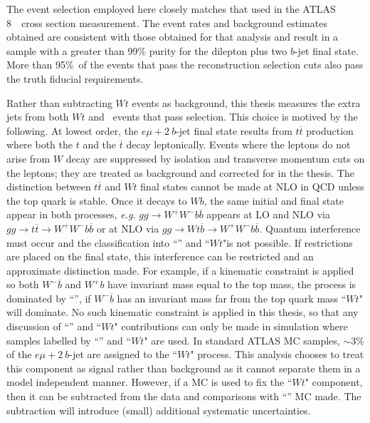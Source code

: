 The event selection employed here closely matches that used in the ATLAS 8~\TeV\ cross
section measurement\cite{xsec}. The event rates and background estimates obtained 
are consistent with those obtained for that analysis and result in a sample with a greater than 99\% purity
for the dilepton plus two $b$-jet final state. More than 95\%\ of
the events that pass the reconstruction selection cuts also pass the truth fiducial requirements.

Rather than subtracting $Wt$ events as background, this thesis measures the extra jets from both $Wt$ and \ttbar\ events that pass selection. This choice is motived by the following. At lowest order, the $e\mu+2\ b$-jet final state results from $t\overline t$ production where both the 
$t$ and the $\overline t$  decay leptonically.  
Events where the leptons do not arise from $W$ decay are suppressed by isolation and
transverse momentum cuts on the leptons; they are treated as background and corrected for in the thesis.
The distinction between $t\overline{t}$ and $Wt$ final states cannot be made at NLO in QCD unless the top quark is stable.
Once it decays to $Wb$, the same initial and final state appear in both processes,
\textit{ e.g.} $gg\to W^+W^- b \overline{b}$ appears at LO and NLO via $gg\to  t\overline{t}\to W^+W^- b \overline{b}$ or
at NLO via  $gg\to  Wt\overline{b} \to W^+W^- b \overline{b}$.
Quantum interference must occur and the classification into
``\ttbar'' and ``$Wt$"is not possible. If restrictions are placed on the final state,
 this interference can be restricted and an approximate distinction made. For example,
if a kinematic constraint is applied so both  $W^-\overline{b}$ and  $W^+ b$
have invariant mass equal to the top mass, 
the process is dominated by ``\ttbar'', if  $W^-\overline{b}$ has an invariant mass
far from the top quark mass ``$Wt$" will dominate.
No such kinematic constraint is applied in this thesis, so that any discussion of  ``\ttbar'' 
and ``$Wt$" contributions can only be made in simulation where samples labelled by 
 ``\ttbar'' and ``$Wt$" are used.  In standard ATLAS MC samples, $\sim 3\%$ of the 
$e\mu+2\ b$-jet are assigned to the ``$Wt$" process.  This analysis chooses to treat this
component as signal rather than background as it cannot separate them in a model independent manner. However, if a MC is used to fix the
 ``$Wt$" component, then it can be subtracted from the data and comparisons with ``\ttbar'' MC made. The subtraction will 
introduce (small) additional systematic uncertainties. 


